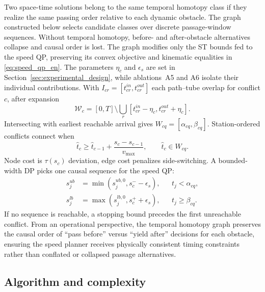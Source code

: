 Two space-time solutions belong to the same temporal homotopy class if they realize the same passing order relative to each dynamic obstacle. The graph constructed below selects candidate classes over discrete passage-window sequences. Without temporal homotopy, before- and after-obstacle alternatives collapse and causal order is lost. The graph modifies only the ST bounds fed to the speed QP, preserving its convex objective and kinematic equalities in \eqref{eq:speed_qp_en}. The parameters $\eta_c$ and $\epsilon_s$ are set in Section~\ref{sec:experimental_design}, while ablations~A5 and A6 isolate their individual contributions. With $I_{cr}=[t_{cr}^{in},t_{cr}^{out}]$ each path--tube overlap for conflict $c$, after expansion
\begin{equation}
 \mathcal{W}_c=[0,T]\setminus\bigcup_r[t_{cr}^{in}-\eta_c,t_{cr}^{out}+\eta_c].
 \label{eq:safe_windows_en}
\end{equation}
Intersecting with earliest reachable arrival gives $W_{cq}=[\alpha_{cq},\beta_{cq}]$. Station-ordered conflicts connect when
\begin{equation}
 \hat t_c\geq\hat t_{c-1}+\frac{s_c-s_{c-1}}{v_{\max}},\qquad \hat t_c\in W_{cq}.
 \label{eq:temporal_edge_en}
\end{equation}
Node cost is $\tau(s_c)$ deviation, edge cost penalizes side-switching. A bounded-width DP picks one causal sequence for the speed QP:
\begin{equation}
 \begin{aligned}
 s_j^{ub}&=\min(s_j^{ub,0},s_c^- -\epsilon_s),&&t_j<\alpha_{cq},\\
 s_j^{lb}&=\max(s_j^{lb,0},s_c^+ +\epsilon_s),&&t_j\geq\beta_{cq}.
 \end{aligned}
 \label{eq:window_to_st_en}
\end{equation}
If no sequence is reachable, a stopping bound precedes the first unreachable conflict. From an operational perspective, the temporal homotopy graph preserves the causal order of ``pass before'' versus ``yield after'' decisions for each obstacle, ensuring the speed planner receives physically consistent timing constraints rather than conflated or collapsed passage alternatives.

\subsection{Algorithm and complexity}

